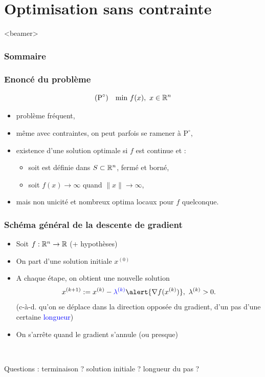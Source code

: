 \documentclass{beamer}
\newcommand{\R}{{\ensuremath\mathbb{R}}}
\begin{document}
\section{Optimisation sans contrainte}

\begin{frame}<beamer>
  \frametitle{Sommaire}
  \tableofcontents[currentsection]
\end{frame}

\begin{frame}
  \frametitle{Enoncé du problème}

  \[
  (\text{P}^\circ) \quad
    \text{min} \ f(x), \ x \in \R^n
  \]

  \begin{itemize}
  \item problème fréquent,
  \item même avec contraintes, on peut parfois se ramener à $\text{P}^\circ$,
  \item existence d'une solution optimale si $f$ est continue et :
    \begin{itemize}
    \item soit est définie dans $S \subset \R^n$, fermé et borné,
    \item soit $f(x) \rightarrow \infty$ quand $\|x\| \rightarrow \infty$, 
    \end{itemize}
  \item mais non unicité et nombreux optima locaux pour $f$ quelconque.
  \end{itemize}
  
\end{frame}

\begin{frame}
  \frametitle{Schéma général de la descente de gradient}

  \begin{itemize}
  \item Soit $f : \R^n \rightarrow \R$ (+ hypothèses)
  \item On part d'une solution initiale $x^{(0)}$
  \item A chaque étape, on obtient une nouvelle solution
    \[ x^{(k+1)} := x^{(k)} - \textcolor{blue}{\lambda^{(k)}} \alert{{\nabla f}(x^{(k)})}, \ \lambda^{(k)} > 0. \]
    (c-à-d. qu'on se déplace dans la direction opposée du \alert{gradient},
    d'un pas d'une certaine \textcolor{blue}{longueur})
  \item On s'arrête quand le gradient s'annule (ou presque)
  \end{itemize}

  ~

  Questions : 
  terminaison ?
  solution initiale ?
  longueur du pas ?
\end{frame}
\end{document}

